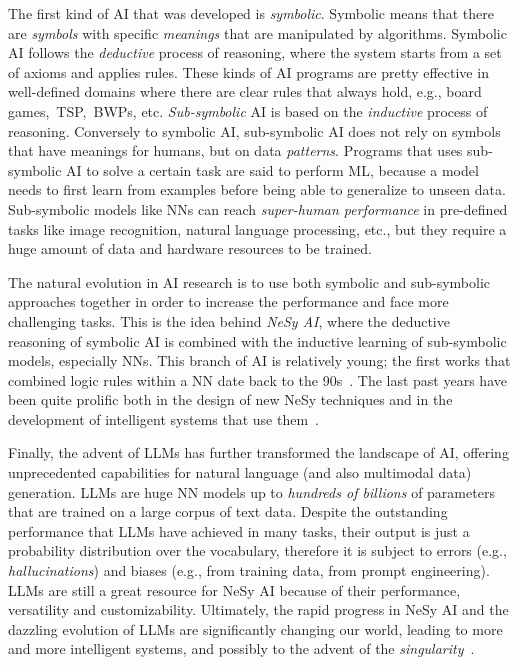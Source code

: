 \begin{refsection}
The first kind of \gls{AI} that was developed is \emph{symbolic}.
%
Symbolic means that there are \emph{symbols} with specific \emph{meanings} that are manipulated by algorithms.
%
Symbolic \gls{AI} follows the \emph{deductive} process of reasoning, where the system starts from a set of axioms and applies rules.
%
These kinds of \gls{AI} programs are pretty effective in well-defined domains where there are clear rules that always hold, e.g., board games,~\gls{TSP},~\acp{BWP}, etc.
%
\emph{Sub-symbolic} \gls{AI} is based on the \emph{inductive} process of reasoning.
%
Conversely to symbolic \gls{AI}, sub-symbolic \gls{AI} does not rely on symbols that have meanings for humans, but on data \emph{patterns}.
%
Programs that uses sub-symbolic \gls{AI} to solve a certain task are said to perform \gls{ML}, because a model needs to first learn from examples before being able to generalize to unseen data.
%
%
Sub-symbolic models like \acp{NN} can reach \emph{super-human performance} in pre-defined tasks like image recognition, natural language processing, etc., but they require a huge amount of data and hardware resources to be trained.


The natural evolution in \gls{AI} research is to use both symbolic and sub-symbolic approaches together in order to increase the performance and face more challenging tasks.
%
This is the idea behind \emph{\gls{NeSy} \gls{AI}}, where the deductive reasoning of symbolic \gls{AI} is combined with the inductive learning of sub-symbolic models, especially \acp{NN}.
%
This branch of \gls{AI} is relatively young; the first works that combined logic rules within a \gls{NN} date back to the 90s~\cite{DBLP:conf/aaai/TowellSN90,DBLP:journals/ai/TowellS94}.
%
The last past years have been quite prolific both in the design of new \gls{NeSy} techniques and in the development of intelligent systems that use them~\cite{DBLP:journals/csur/CiattoSAMO24}.


Finally, the advent of \acp{LLM} has further transformed the landscape of \gls{AI}, offering unprecedented capabilities for natural language (and also multimodal data) generation.
%
\Acp{LLM} are huge \gls{NN} models up to \emph{hundreds of billions} of parameters that are trained on a large corpus of text data.
%
Despite the outstanding performance that \acp{LLM} have achieved in many tasks, their output is just a probability distribution over the vocabulary, therefore it is subject to errors (e.g., \emph{hallucinations}) and biases (e.g., from training data, from prompt engineering).
%
\Acp{LLM} are still a great resource for \gls{NeSy} \gls{AI} because of their performance, versatility and customizability.
%
Ultimately, the rapid progress in \gls{NeSy} \gls{AI} and the dazzling evolution of \acp{LLM} are significantly changing our world, leading to more and more intelligent systems, and possibly to the advent of the \emph{singularity}~\cite{shanahan2015technological}.



\end{refsection}

